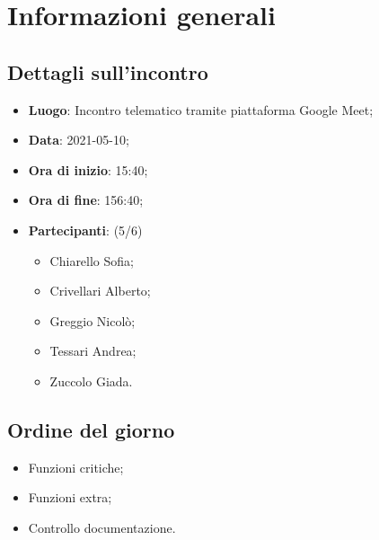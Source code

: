 \section{Informazioni generali}

\subsection{Dettagli sull'incontro}
\begin{itemize}
\item \textbf{Luogo}: Incontro telematico tramite piattaforma Google Meet;
\item \textbf{Data}: 2021-05-10;
\item \textbf{Ora di inizio}: 15:40;
\item \textbf{Ora di fine}: 156:40;
\item \textbf{Partecipanti}: (5/6) 
\begin{itemize}
	\item Chiarello Sofia;
	\item Crivellari Alberto;
	\item Greggio Nicolò;
	\item Tessari Andrea;
	\item Zuccolo Giada.
\end{itemize}
\end{itemize}

\subsection{Ordine del giorno}
\begin{itemize}
	\item Funzioni critiche;
	\item Funzioni extra;
	\item Controllo documentazione.
\end{itemize}


